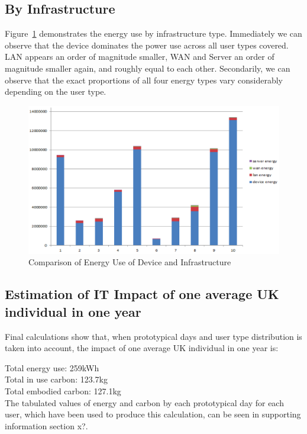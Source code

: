 \documentclass[conference]{IEEEtran}
\begin{document}
\subsection{By Infrastructure}

Figure~\ref{fig:energyusecomparison} demonstrates the energy use by
infrastructure type.  Immediately we can observe that the device
dominates the power use across all user types covered. LAN appears an
order of magnitude smaller, WAN and Server an order of magnitude
smaller again, and roughly equal to each other. Secondarily, we can
observe that the exact proportions of all four energy types vary
considerably depending on the user type.

\begin{figure}[!htp]
\centering
\includegraphics[width=\textwidth]{images/energyuse_comparison.png}
\caption{Comparison of Energy Use of Device and Infrastructure}
\label{fig:energyusecomparison} 
\end{figure}

\subsection{Estimation of IT Impact of one average UK individual in
  one year}

Final calculations show that, when prototypical days and user type
distribution is taken into account, the impact of one average UK
individual in one year is:

Total energy use: 259kWh\\
Total in use carbon: 123.7kg\\
Total embodied carbon: 127.1kg\\

The tabulated values of energy and carbon by each prototypical day for
each user, which have been used to produce this calculation, can be
seen in supporting information section x?.
\end{document}
